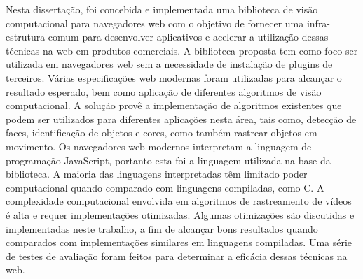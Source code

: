 Nesta dissertação, foi concebida e implementada uma biblioteca de visão computacional para navegadores web com o objetivo de fornecer uma infra-estrutura comum para desenvolver aplicativos e acelerar a utilização dessas técnicas na web em produtos comerciais. A biblioteca proposta tem como foco ser utilizada em navegadores web sem a necessidade de instalação de plugins de terceiros. Várias especificações web modernas foram utilizadas para alcançar o resultado esperado, bem como aplicação de diferentes algoritmos de visão computacional. A solução provê a implementação de algoritmos existentes que podem ser utilizados para diferentes aplicações nesta área, tais como, detecção de faces, identificação de objetos e cores, como também rastrear objetos em movimento. Os navegadores web modernos interpretam a linguagem de programação JavaScript, portanto esta foi a linguagem utilizada na base da biblioteca. A maioria das linguagens interpretadas têm limitado poder computacional quando comparado com linguagens compiladas, como C. A complexidade computacional envolvida em algoritmos de rastreamento de vídeos é alta e requer implementações otimizadas. Algumas otimizações são discutidas e implementadas neste trabalho, a fim de alcançar bons resultados quando comparados com implementações similares em linguagens compiladas. Uma série de testes de avaliação foram feitos para determinar a eficácia dessas técnicas na web.